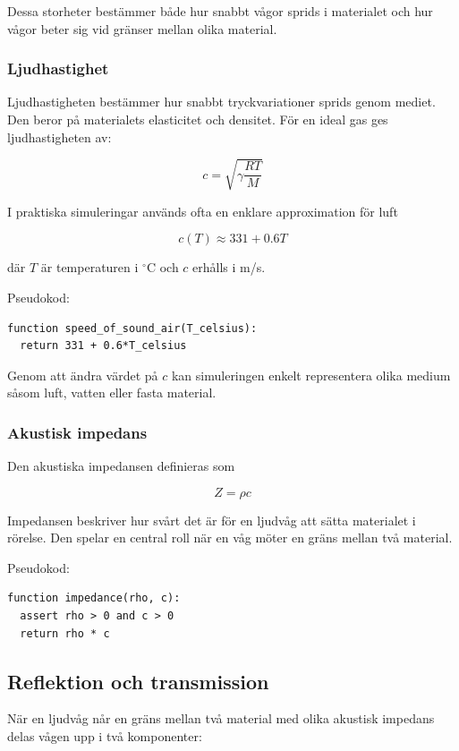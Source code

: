\documentclass[11pt,a4paper]{article}
\begin{document}
Dessa storheter bestämmer både hur snabbt vågor sprids i
materialet och hur vågor beter sig vid gränser mellan
olika material.


\subsubsection{Ljudhastighet}
Ljudhastigheten bestämmer hur snabbt tryckvariationer
sprids genom mediet. Den beror på materialets elasticitet
och densitet. För en ideal gas ges ljudhastigheten av:

\begin{equation}
c = \sqrt{\gamma \frac{RT}{M}}
\end{equation}

I praktiska simuleringar används ofta en enklare
approximation för luft

\begin{equation}
c(T) \approx 331 + 0.6T
\end{equation}

där $T$ är temperaturen i $^\circ$C och $c$ erhålls i m/s.

Pseudokod:
\begin{lstlisting}[style=pseudocode]
function speed_of_sound_air(T_celsius):
  return 331 + 0.6*T_celsius
\end{lstlisting}

Genom att ändra värdet på $c$ kan simuleringen enkelt
representera olika medium såsom luft, vatten eller fasta
material.


\subsubsection{Akustisk impedans}
Den akustiska impedansen definieras som

\begin{equation}
Z = \rho c
\end{equation}

Impedansen beskriver hur svårt det är för en ljudvåg
att sätta materialet i rörelse. Den spelar en central
roll när en våg möter en gräns mellan två material.

Pseudokod:
\begin{lstlisting}[style=pseudocode]
function impedance(rho, c):
  assert rho > 0 and c > 0
  return rho * c
\end{lstlisting}


\subsection{Reflektion och transmission}
När en ljudvåg når en gräns mellan två material med olika
akustisk impedans delas vågen upp i två komponenter:
\end{document}
